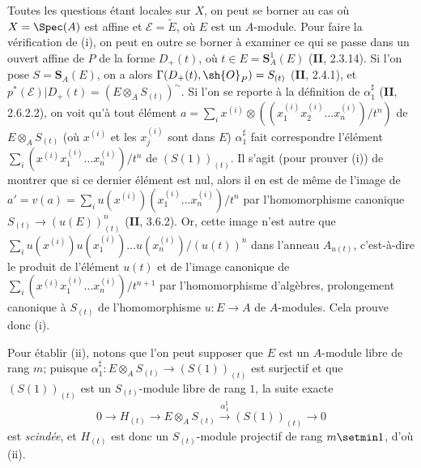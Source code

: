Toutes les questions étant locales sur $X$, on peut se borner au cas où $X=\Spec(A)$ est affine et $\mathscr E=\widetilde E$, où $E$ est un $A$-module. Pour faire la vérification de (i), on peut en outre se borner à examiner ce qui se passe dans un ouvert affine de $P$ de la forme $D_+(t)$, où $t\in E=\mathbf S_A^1(E)$ (\textbf{II}, 2.3.14). Si l'on pose $S=\mathbf S_A(E)$, on a alors $\Gamma(D_+(t),\sh{O}_P)=S_{(t)}$ (\textbf{II}, 2.4.1), et $p^*(\mathscr E)|D_+(t)=(E\otimes_A S_{(t)})^\sim$. Si l'on se reporte à la définition de $\alpha_1^{\sharp}$ (\textbf{II}, 2.6.2.2), on voit qu'à tout élément $a=\sum_i x^{(i)}\otimes((x_1^{(i)}x_2^{(i)}\ldots x_n^{(i)})/t^n)$ de $E\otimes_A S_{(t)}$ (où $x^{(i)}$ et les $x_j^{(i)}$ sont dans $E$) $\alpha_1^{\sharp}$ fait correspondre l'élément $\sum_i(x^{(i)}x_1^{(i)}\ldots x_n^{(i)})/t^n$ de $(S(1))_{(t)}$. Il s'agit (pour prouver (i)) de montrer que si ce dernier élément est nul, alors il en est de même de l'image de $a'=v(a)=\sum_i u(x^{(i)})(x_1^{(i)}\ldots x_n^{(i)})/t^n$ par l'homomorphisme canonique $S_{(t)}\to(u(E))^n_{(t)}$ (\textbf{II}, 3.6.2). Or, cette image n'est autre que $\sum_i u(x^{(i)})u(x_1^{(i)})\ldots u(x_n^{(i)})/(u(t))^n$ dans l'anneau $A_{u(t)}$, c'est-à-dire le produit de l'élément $u(t)$ et de l'image canonique de $\sum_i(x^{(i)}x_1^{(i)}\ldots x_n^{(i)})/t^{n+1}$ par l'homomorphisme d'algèbres, prolongement canonique à $S_{(t)}$ de l'homomorphisme $u:E\to A$ de $A$-modules. Cela prouve donc (i).

Pour établir (ii), notons que l'on peut supposer que $E$ est un $A$-module libre de rang $m$; puisque $\alpha_1^{\sharp}:E\otimes_A S_{(t)}\to(S(1))_{(t)}$ est surjectif et que $(S(1))_{(t)}$ est un $S_{(t)}$-module libre de rang $1$, la suite exacte
\[
  0\longrightarrow H_{(t)}\longrightarrow E\otimes_A S_{(t)}\xrightarrow{\alpha_1^{\sharp}}(S(1))_{(t)}\longrightarrow0
\]
est \emph{scindée}, et $H_{(t)}$ est donc un $S_{(t)}$-module projectif de rang $m\setmin 1$, d'où (ii).

